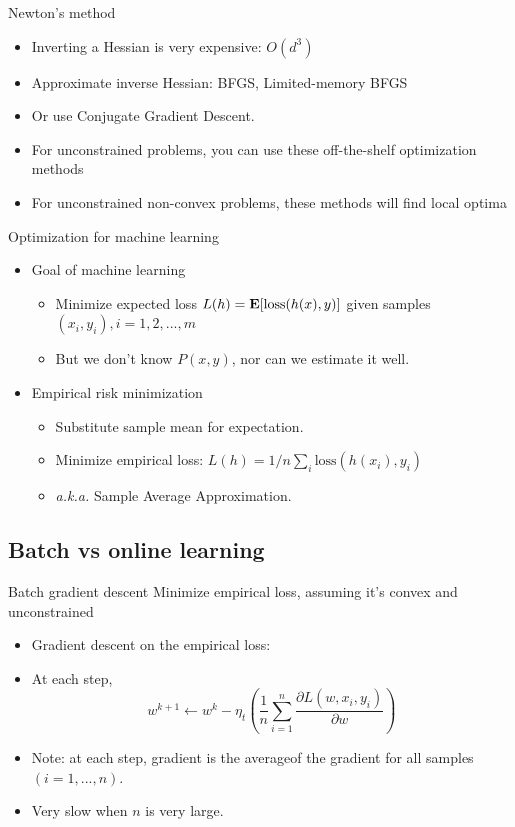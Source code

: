 \documentclass[draft]{beamer}
\begin{document}
\begin{frame}
	{Newton's method} 
	\begin{itemize}
		\item Inverting a Hessian is very expensive: $O(d^3)$ 
		\item Approximate inverse Hessian: BFGS, Limited-memory BFGS
		\item Or use Conjugate Gradient Descent.  
		\item For unconstrained problems, you can use these off-the-shelf optimization methods 
		\item For unconstrained non-convex problems, these methods  will find local optima 
	\end{itemize}
\end{frame}

\begin{frame}
	{Optimization for machine learning} 
	\begin{itemize}
		\item Goal of machine learning 
		\begin{itemize}
			\item Minimize expected loss $L(h) = \mathbf{E} [ \mathrm{loss} (h(x),y )] $ given samples $(x_i,y_i ), i = 1,2,...,m $ 
			\item But we don't know $P(x,y)$, nor can we estimate it well. 
			
		\end{itemize}
		\item Empirical risk minimization
		\begin{itemize}
			\item Substitute sample mean for expectation. 
			\item Minimize empirical loss: $L(h) = 1/n \sum_i \mathrm{loss} (h(x_i), y_i ) $ 
			\item \textit{a.k.a. } Sample Average Approximation. 
		\end{itemize}
	\end{itemize}
\end{frame}

\subsection{Batch vs online learning} 

\begin{frame}{Batch gradient descent} 
	Minimize empirical loss, assuming it's convex and unconstrained 
	\begin{itemize}
		\item Gradient descent on the empirical loss: 
		\item At each step, 
		$$w^{k+1} \leftarrow w^{k} - \eta_t 
		\left( \frac{1}{n} \sum_{i=1}^{n}
		 \frac{\partial L(w,x_i,y_i)}{\partial w} \right) $$
		\item Note: at each step, gradient is the averageof the gradient for all samples $(i=1,...,n)$. 
		\item Very slow when $n$  is very large. 
	\end{itemize}
	
\end{frame}
\end{document}
